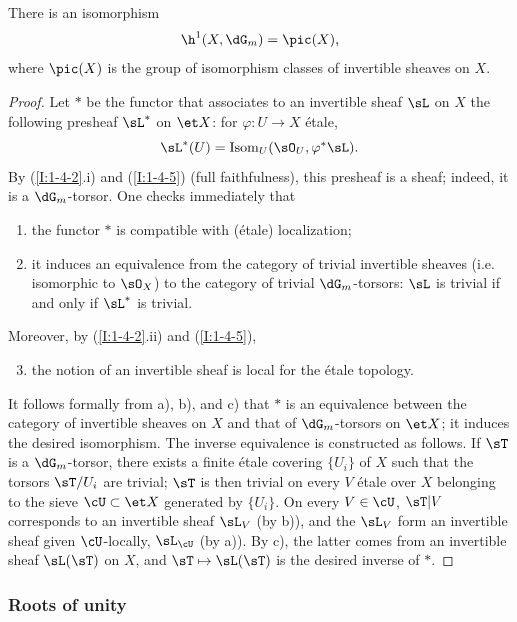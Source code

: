 \begin{proposition}\label{I:2-2-3}
There is an isomorphism
\[
  \h^1(X,\dG_m) = \pic(X)\text{,}
\]
where $\pic(X)$ is the group of isomorphism classes of invertible sheaves
on $X$.
\end{proposition}
\begin{proof}
Let $*$ be the functor that associates to an invertible sheaf $\sL$ on
$X$ the following presheaf $\sL^*$ on $\et X$: for
$\varphi:U\to X$ étale,
\[
  \sL^*(U)=\operatorname{Isom}_U(\sO_U,\varphi^*\sL)\text{.}
\]
By (\ref{I:1-4-2}.i) and (\ref{I:1-4-5}) (full faithfulness), this
presheaf is a sheaf; indeed, it is a $\dG_m$-torsor. One checks
immediately that
\begin{enumerate}[\indent a)]
  \item the functor $*$ is compatible with (étale) localization;
  \item it induces an equivalence from the category of trivial invertible
    sheaves (i.e. isomorphic to $\sO_X$) to the category of trivial
    $\dG_m$-torsors: $\sL$ is trivial if and only if $\sL^*$ is trivial.
\end{enumerate}

Moreover, by (\ref{I:1-4-2}.ii) and (\ref{I:1-4-5}),
\begin{enumerate}[\indent a)]
\setcounter{enumi}{2}
  \item {}the notion of an invertible sheaf is local for the étale topology.
\end{enumerate}

It follows formally from a), b), and c) that $*$ is an equivalence between
the category of invertible sheaves on $X$ and that of $\dG_m$-torsors on
$\et X$; it induces the desired isomorphism. The inverse equivalence is
constructed as follows. If $\sT$ is a $\dG_m$-torsor, there exists a
finite étale covering $\{U_i\}$ of $X$ such that the torsors
$\sT/U_i$ are trivial; $\sT$ is then trivial on every $V$ étale over
$X$ belonging to the sieve $\cU\subset\et X$ generated by $\{U_i\}$.
On every $V\in\cU$, $\sT|V$ corresponds to an invertible sheaf $\sL_V$
(by b)), and the $\sL_V$ form an invertible sheaf given $\cU$-locally,
$\sL_\cU$ (by a)). By c), the latter comes from an invertible sheaf
$\sL(\sT)$ on $X$, and $\sT\mapsto\sL(\sT)$ is the desired inverse
of $*$.
\end{proof}

\subsubsection{Roots of unity}\label{I:2-2-4}


